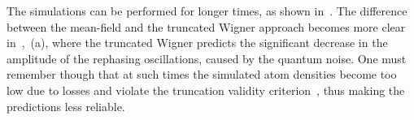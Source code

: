 The simulations can be performed for longer times, as shown in~.
The difference between the mean-field and the truncated Wigner approach becomes more clear in~,~(a), where the truncated Wigner predicts the significant decrease in the amplitude of the rephasing oscillations, caused by the quantum noise.
One must remember though that at such times the simulated atom densities become too low due to losses and violate the truncation validity criterion~, thus making the predictions less reliable.
